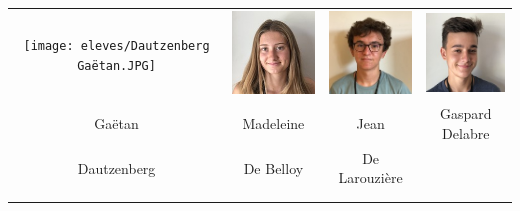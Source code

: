 \begin{center}
\begin{tabular}{cccc}
\texttt{[image: eleves/Dautzenberg Gaëtan.JPG]} &
\includegraphics[angle=270,origin=c, width=27mm]{eleves/De Belloy Madeleine.JPG} &
\includegraphics[angle=270,origin=c, width=27mm]{eleves/De Larouziere Jean.JPG} &
\includegraphics[angle=270,origin=c, width=27mm]{eleves/Delabre Gaspard.JPG} \\
Gaëtan & Madeleine & Jean & Gaspard Delabre \\ Dautzenberg & De Belloy & De Larouzière & \\ \\ \\

\end{tabular}
\end{center}

\vfill
\pagebreak

